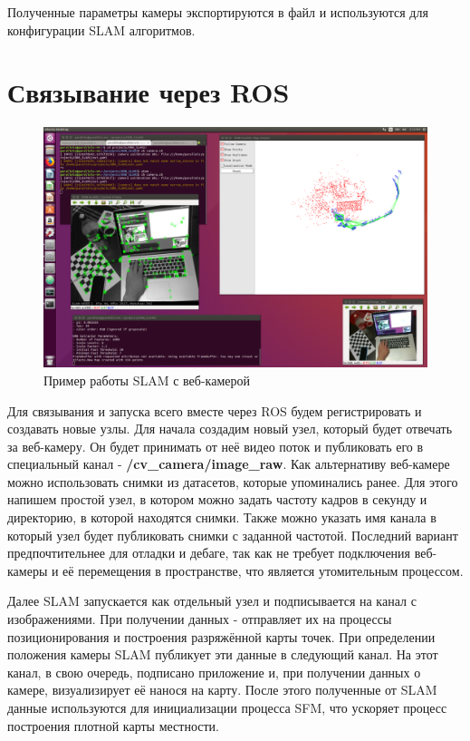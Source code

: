 \vspace{1em}
Полученные параметры камеры экспортируются в файл и используются для конфигурации SLAM алгоритмов.

\section{Связывание через ROS}

\begin{figure}[h]
    \centering
    \includegraphics[width=1.0\textwidth]{images/ros-slam.png}
    \caption{Пример работы SLAM с веб-камерой}
    \label{fig:ros-slam}
\end{figure}

Для связывания и запуска всего вместе через ROS будем регистрировать и создавать новые узлы. Для начала создадим новый узел, который будет отвечать за веб-камеру. Он будет принимать от неё видео поток и публиковать его в специальный канал - \textbf{/cv\_camera/image\_raw}. Как альтернативу веб-камере можно использовать снимки из датасетов, которые упоминались ранее. Для этого напишем простой узел, в котором можно задать частоту кадров в секунду и директорию, в которой находятся снимки. Также можно указать имя канала в который узел будет публиковать снимки с заданной частотой. Последний вариант предпочтительнее для отладки и дебаге, так как не требует подключения веб-камеры и её перемещения в пространстве, что является утомительным процессом.

Далее SLAM запускается как отдельный узел и подписывается на канал с изображениями. При получении данных - отправляет их на процессы позиционирования и построения разряжённой карты точек. При определении положения камеры SLAM публикует эти данные в следующий канал. На этот канал, в свою очередь, подписано приложение и, при получении данных о камере, визуализирует её нанося на карту. После этого полученные от SLAM данные используются для инициализации процесса SFM, что ускоряет процесс построения плотной карты местности.